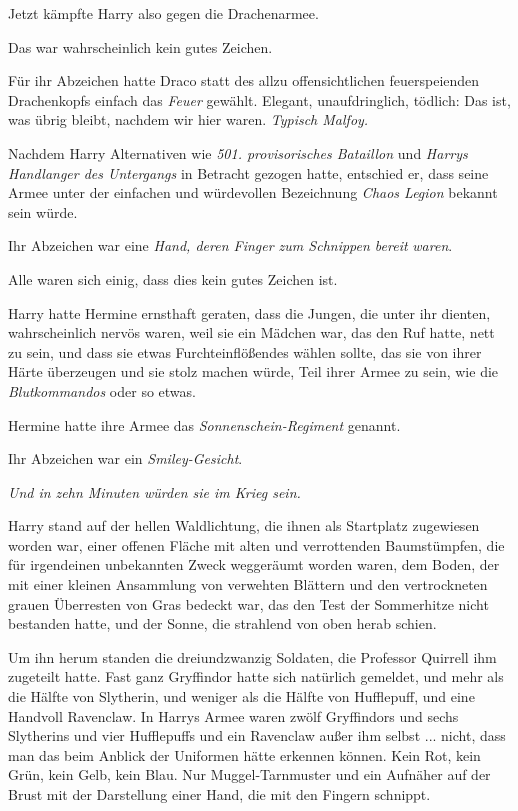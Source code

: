Jetzt kämpfte Harry also gegen die Drachenarmee.

Das war wahrscheinlich kein gutes Zeichen.

Für ihr Abzeichen hatte Draco statt des allzu offensichtlichen feuerspeienden
Drachenkopfs einfach das \emph{Feuer} gewählt. Elegant, unaufdringlich, tödlich:
Das ist, was übrig bleibt, nachdem wir hier waren. \emph{Typisch Malfoy.}

Nachdem Harry Alternativen wie \emph{501. provisorisches Bataillon} und
\emph{Harrys Handlanger des Untergangs} in Betracht gezogen hatte, entschied er,
dass seine Armee unter der einfachen und würdevollen Bezeichnung \emph{Chaos
Legion} bekannt sein würde.

Ihr Abzeichen war eine \emph{Hand, deren Finger zum Schnippen bereit}
\emph{waren}.

Alle waren sich einig, dass dies kein gutes Zeichen ist.

Harry hatte Hermine ernsthaft geraten, dass die Jungen, die unter ihr dienten,
wahrscheinlich nervös waren, weil sie ein Mädchen war, das den Ruf hatte, nett
zu sein, und dass sie etwas Furchteinflößendes wählen sollte, das sie von ihrer
Härte überzeugen und sie stolz machen würde, Teil ihrer Armee zu sein, wie die
\emph{Blutkommandos} oder so etwas.

Hermine hatte ihre Armee das \emph{Sonnenschein-Regiment} genannt.

Ihr Abzeichen war ein \emph{Smiley-Gesicht}.

\emph{Und in zehn Minuten würden sie im Krieg sein.}

Harry stand auf der hellen Waldlichtung, die ihnen als Startplatz zugewiesen
worden war, einer offenen Fläche mit alten und verrottenden Baumstümpfen, die
für irgendeinen unbekannten Zweck weggeräumt worden waren, dem Boden, der mit
einer kleinen Ansammlung von verwehten Blättern und den vertrockneten grauen
Überresten von Gras bedeckt war, das den Test der Sommerhitze nicht bestanden
hatte, und der Sonne, die strahlend von oben herab schien.

Um ihn herum standen die dreiundzwanzig Soldaten, die Professor Quirrell ihm
zugeteilt hatte. Fast ganz Gryffindor hatte sich natürlich gemeldet, und mehr
als die Hälfte von Slytherin, und weniger als die Hälfte von Hufflepuff, und
eine Handvoll Ravenclaw. In Harrys Armee waren zwölf Gryffindors und sechs
Slytherins und vier Hufflepuffs und ein Ravenclaw außer ihm selbst ... nicht,
dass man das beim Anblick der Uniformen hätte erkennen können. Kein Rot, kein
Grün, kein Gelb, kein Blau. Nur Muggel-Tarnmuster und ein Aufnäher auf der Brust
mit der Darstellung einer Hand, die mit den Fingern schnippt.

